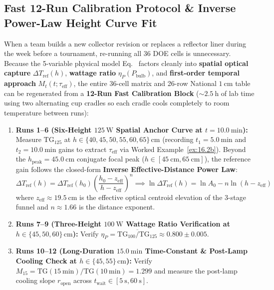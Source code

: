 \subsection{Fast 12-Run Calibration Protocol \& Inverse Power-Law Height Curve Fit}
When a team builds a new collector revision or replaces a reflector liner during the week before a tournament, re-running all 36 DOE cells is unnecessary. Because the 5-variable physical model Eq.~ factors cleanly into \textbf{spatial optical capture} $\Delta T_{\mathrm{ref}}(h)$, \textbf{wattage ratio} $\eta_P(P_{\mathrm{bulb}})$, and \textbf{first-order temporal approach} $M_t(t; \tau_{\mathrm{eff}})$, the entire 36-cell matrix and 26-row National $\SI{1}{\centi\meter}$ table can be regenerated from a \textbf{12-Run Fast Calibration Block} ($\sim\SI{2.5}{\hour}$ of lab time using two alternating cup cradles so each cradle cools completely to room temperature between runs):
\begin{enumerate}
  \item \textbf{Runs 1--6 (Six-Height $\SI{125}{\watt}$ Spatial Anchor Curve at $t = \SI{10.0}{\minute}$):} Measure $\mathrm{TG}_{125}$ at $h \in \{40, 45, 50, 55, 60, 65\}\,\si{\centi\meter}$ (recording $t_1 = \SI{5.0}{\minute}$ and $t_2 = \SI{10.0}{\minute}$ gains to extract $\tau_{\mathrm{eff}}$ via Worked Example~\ref{ex:16.2b}). Beyond the $h_{\mathrm{peak}} = \SI{45.0}{\centi\meter}$ conjugate focal peak ($h \in [\SI{45}{\centi\meter}, \SI{65}{\centi\meter}]$), the reference gain follows the closed-form \textbf{Inverse Effective-Distance Power Law}:
  \begin{equation}\label{eq:16:power-law-h}
    \Delta T_{\mathrm{ref}}(h) = \Delta T_{\mathrm{ref}}(h_0)\!\left(\frac{h_0 - z_{\mathrm{eff}}}{h - z_{\mathrm{eff}}}\right)^{\!n} \implies \ln\Delta T_{\mathrm{ref}}(h) = \ln A_0 - n\ln(h - z_{\mathrm{eff}})
  \end{equation}
  where $z_{\mathrm{eff}} \approx \SI{19.5}{\centi\meter}$ is the effective optical centroid elevation of the 3-stage funnel and $n \approx 1.66$ is the distance exponent.
  \item \textbf{Runs 7--9 (Three-Height $\SI{100}{\watt}$ Wattage Ratio Verification at $h \in \{45, 50, 60\}\,\si{\centi\meter}$):} Verify $\eta_P = \overline{\mathrm{TG}_{100} / \mathrm{TG}_{125}} \approx 0.800 \pm 0.005$.
  \item \textbf{Runs 10--12 (Long-Duration $\SI{15.0}{\minute}$ Time-Constant \& Post-Lamp Cooling Check at $h \in \{45, 55\}\,\si{\centi\meter}$):} Verify $M_{15} = \mathrm{TG}(\SI{15}{\minute})/\mathrm{TG}(\SI{10}{\minute}) = 1.299$ and measure the post-lamp cooling slope $r_{\mathrm{open}}$ across $t_{\mathrm{wait}} \in [\SI{5}{\second}, \SI{60}{\second}]$.
\end{enumerate}

